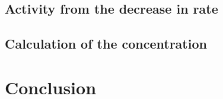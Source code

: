 

\subsection{Activity from the decrease in rate}
\label{sec:SAfromDecrease}



\subsection{Calculation of the concentration}
\label{sec:calcOfTheCon}


\section{Conclusion}




































